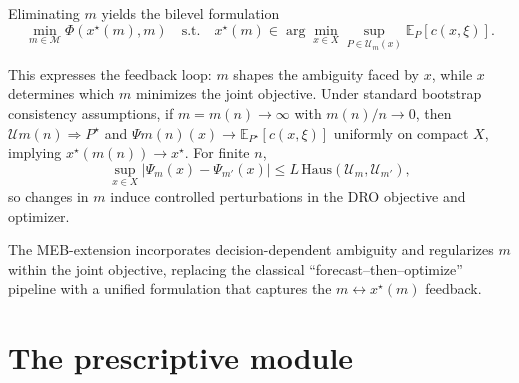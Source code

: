 \documentclass[11pt]{article}
\begin{document}
Eliminating $m$ yields the bilevel formulation
\begin{equation}
	\min_{m\in\mathcal{M}} 
	\Phi(x^\star(m),m)
	\quad\text{s.t.}\quad
	x^\star(m)\in\arg\min_{x\in X}
	\sup_{P\in\mathcal{U}_m(x)}\mathbb{E}_P[c(x,\xi)].
\end{equation}

This expresses the feedback loop: $m$ shapes the ambiguity faced by $x$, while $x$ determines which $m$ minimizes the joint objective.
Under standard bootstrap consistency assumptions, if $m=m(n)\to\infty$ with $m(n)/n\to 0$, then $\mathcal{U}{m(n)}\Rightarrow P^\star$ and $\Psi{m(n)}(x)\to\mathbb{E}_{P^\star}[c(x,\xi)]$ uniformly on compact $X$, implying $x^\star(m(n))\to x^\star$. For finite $n$,
\begin{equation}
	\sup_{x\in X}\big|\Psi_m(x)-\Psi_{m'}(x)\big|
	\le 
	L\,\mathrm{Haus}\!\left(\mathcal{U}_m,\mathcal{U}_{m'}\right),
\end{equation}
so changes in $m$ induce controlled perturbations in the DRO objective and optimizer.

The MEB-extension incorporates decision-dependent ambiguity and regularizes $m$ within the joint objective, replacing the classical ``forecast--then--optimize'' pipeline with a unified formulation that captures the $m\leftrightarrow x^\star(m)$ feedback.


\section{The prescriptive module} \label{Sec:optimization}
\end{document}
